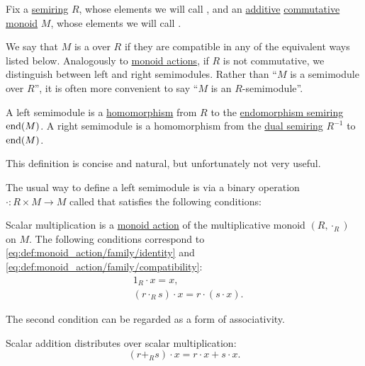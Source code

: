 \begin{definition}\label{def:semimodule}
  Fix a \hyperref[def:semiring]{semiring} \( R \), whose elements we will call , and an \hyperref[rem:additive_magma]{additive} \hyperref[def:magma/commutative]{commutative} \hyperref[def:monoid]{monoid} \( M \), whose elements we will call .

  We say that \( M \) is a  over \( R \) if they are compatible in any of the equivalent ways listed below. Analogously to \hyperref[def:monoid_action]{monoid actions}, if \( R \) is not commutative, we distinguish between left and right semimodules. Rather than \enquote{\( M \) is a semimodule over \( R \)}, it is often more convenient to say \enquote{\( M \) is an \( R \)-semimodule}.

  \begin{thmenum}[series=def:semimodule]
     A left semimodule is a \hyperref[def:semiring/homomorphism]{homomorphism} from \( R \) to the \hyperref[def:endomorphism_semiring]{endomorphism semiring} \( \operatorname{end}(M) \). A right semimodule is a homomorphism from the \hyperref[def:semiring/duality]{dual semiring} \( R^{-1} \) to \( \operatorname{end}(M) \).

    This definition is concise and natural, but unfortunately not very useful.

     The usual way to define a left semimodule is via a binary operation \( \cdot: R \times M \to M \) called  that satisfies the following conditions:
    \begin{thmenum}
       Scalar multiplication is a \hyperref[def:monoid_action]{monoid action} of the multiplicative monoid \( (R, \cdot_R) \) on \( M \). The following conditions correspond to \eqref{eq:def:monoid_action/family/identity} and \eqref{eq:def:monoid_action/family/compatibility}:
      \begin{align}
        &1_R \cdot x = x, \label{eq:def:semimodule/operation/scalar_multiplication_action/identity} \\
        &(r \cdot_R s) \cdot x = r \cdot (s \cdot x). \label{eq:def:semimodule/operation/scalar_multiplication_action/compatibility}
      \end{align}

      The second condition can be regarded as a form of associativity.

       Scalar addition distributes over scalar multiplication:
      \begin{equation}\label{eq:def:semimodule/operation/scalar_addition_distributivity}
        (r +_R s) \cdot x = r \cdot x + s \cdot x.
      \end{equation}


\end{thmenum}
\end{thmenum}
\end{definition}
